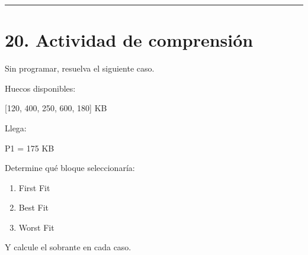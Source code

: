 \documentclass[
  spanish,
  letterpaper,
]{scrbook}
\newenvironment{Shaded}{\begin{snugshade}}{\end{snugshade}}
\newcommand{\NormalTok}[1]{\textcolor[rgb]{0.00,0.23,0.31}{#1}}
\providecommand{\tightlist}{%
  \setlength{\itemsep}{0pt}\setlength{\parskip}{0pt}}
\begin{document}
\begin{center}\rule{0.5\linewidth}{0.5pt}\end{center}


\chapter{20. Actividad de
comprensión}\label{actividad-de-comprensiuxf3n}

Sin programar, resuelva el siguiente caso.

Huecos disponibles:

\begin{Shaded}
\begin{Highlighting}[]
\NormalTok{[120, 400, 250, 600, 180] KB}
\end{Highlighting}
\end{Shaded}

Llega:

\begin{Shaded}
\begin{Highlighting}[]
\NormalTok{P1 = 175 KB}
\end{Highlighting}
\end{Shaded}

Determine qué bloque seleccionaría:

\begin{enumerate}
\def\labelenumi{\arabic{enumi}.}
\tightlist
\item
  First Fit
\item
  Best Fit
\item
  Worst Fit
\end{enumerate}

Y calcule el sobrante en cada caso.
\end{document}
